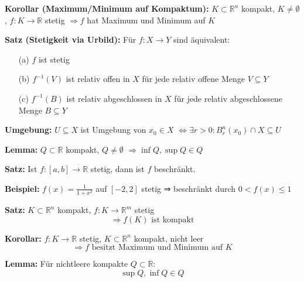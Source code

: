 \textbf{Korollar (Maximum/Minimum auf Kompaktum):}  
\(K \subset \mathbb{R}^n\) kompakt, \(K \ne \emptyset\), \(f: K \to \mathbb{R}\) stetig  
\(\Rightarrow f\) hat Maximum und Minimum auf \(K\)

\textbf{Satz (Stetigkeit via Urbild):}  
Für \(f: X \to Y\) sind äquivalent:
\begin{itemize}
  \item[(a)] \(f\) ist stetig
  \item[(b)] \(f^{-1}(V)\) ist relativ offen in \(X\) für jede relativ offene Menge \(V \subseteq Y\)
  \item[(c)] \(f^{-1}(B)\) ist relativ abgeschlossen in \(X\) für jede relativ abgeschlossene Menge \(B \subseteq Y\)
\end{itemize}

\textbf{Umgebung:}  
\(U \subseteq X\) ist Umgebung von \(x_0 \in X\)  
\(\Leftrightarrow \exists r > 0: B_r^n(x_0) \cap X \subseteq U\)

\textbf{Lemma:}  
\(Q \subset \mathbb{R}\) kompakt, \(Q \ne \emptyset\)  
\(\Rightarrow \inf Q, \sup Q \in Q\)

\textbf{Satz:}  
Ist \( f: [a,b] \to \mathbb{R} \) stetig, dann ist \( f \) beschränkt.

\textbf{Beispiel:}  
\( f(x) = \frac{1}{1 + x^2} \) auf \( [-2, 2] \) stetig ⇒ beschränkt durch \( 0 < f(x) \leq 1 \)

\textbf{Satz:}  
\( K \subset \mathbb{R}^n \) kompakt,\; \( f: K \to \mathbb{R}^m \) stetig  
\[
\Rightarrow f(K) \text{ ist kompakt}
\]


\textbf{Korollar:}  
\( f: K \to \mathbb{R} \) stetig, \( K \subset \mathbb{R}^n \) kompakt, nicht leer  
\[
\Rightarrow f \text{ besitzt Maximum und Minimum auf } K
\]


\textbf{Lemma:}  
Für nichtleere kompakte \( Q \subset \mathbb{R} \):  
\[
\sup Q, \inf Q \in Q
\]

